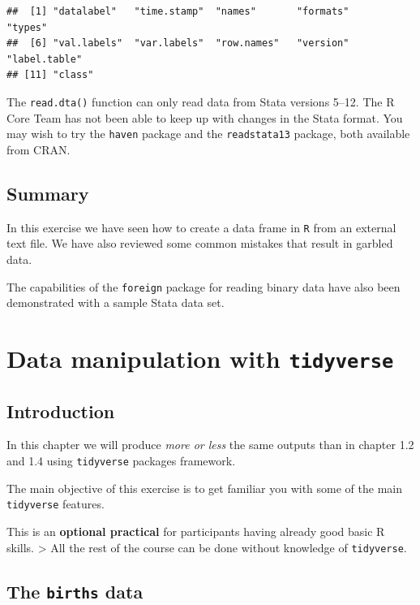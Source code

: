 \documentclass[
]{book}
\begin{document}
\begin{verbatim}
##  [1] "datalabel"   "time.stamp"  "names"       "formats"     "types"      
##  [6] "val.labels"  "var.labels"  "row.names"   "version"     "label.table"
## [11] "class"
\end{verbatim}

The \texttt{read.dta()} function can only read data from Stata
versions 5--12. The R Core Team has not been able to keep up with
changes in the Stata format. You may wish to try the \texttt{haven}
package and the \texttt{readstata13} package, both available from
CRAN.

\section{Summary}\label{summary}

In this exercise we have seen how to create a data frame in \texttt{R}
from an external text file. We have also reviewed some common mistakes
that result in garbled data.

The capabilities of the \texttt{foreign} package for reading binary
data have also been demonstrated with a sample Stata data set.

\chapter{\texorpdfstring{Data manipulation with \texttt{tidyverse}}{Data manipulation with tidyverse}}\label{data-manipulation-with-tidyverse}

\section{Introduction}\label{introduction-1}

In this chapter we will produce \emph{more or less} the same outputs than in chapter 1.2 and 1.4 using
\texttt{tidyverse} packages framework.

The main objective of this exercise is to get familiar you with some of the main \texttt{tidyverse} features.

This is an \textbf{optional practical} for participants having already good basic R skills.
\textgreater{} All the rest of the course can be done without knowledge of \texttt{tidyverse}.

\section{\texorpdfstring{The \texttt{births} data}{The births data}}\label{the-births-data}
\end{document}
